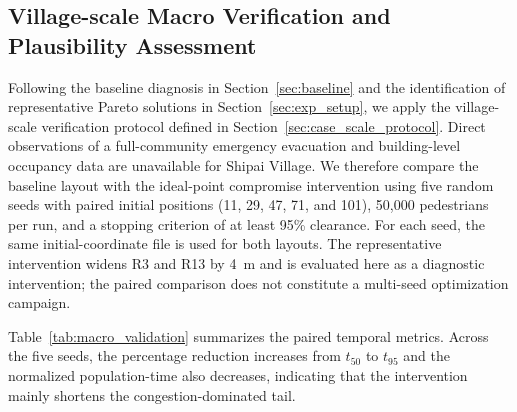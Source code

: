 \documentclass[preprint,12pt]{elsarticle}
\newcommand{\revfloat}{\color{blue}\captionsetup{font={color=blue},labelfont={color=blue}}}
\begin{document}
{\color{blue}
\subsection{Village-scale Macro Verification and Plausibility Assessment}
\label{sec:macro_verification}

Following the baseline diagnosis in Section~\ref{sec:baseline} and the identification of representative Pareto solutions
in Section~\ref{sec:exp_setup}, we apply the village-scale verification protocol defined in
Section~\ref{sec:case_scale_protocol}. Direct observations of a full-community emergency evacuation and building-level
occupancy data are unavailable for Shipai Village. We therefore compare the baseline layout with the ideal-point
compromise intervention using five random seeds with paired initial positions (11, 29, 47, 71, and 101), 50,000 pedestrians per run,
and a stopping criterion of at least 95\% clearance. For each seed, the same initial-coordinate file is used for both
layouts. The representative intervention widens R3 and R13 by 4~m and is evaluated here as a diagnostic intervention;
the paired comparison does not constitute a multi-seed optimization campaign.

Table~\ref{tab:macro_validation} summarizes the paired temporal metrics. Across the five seeds, the percentage reduction increases
from $t_{50}$ to $t_{95}$ and the normalized population-time also decreases, indicating that the intervention mainly
shortens the congestion-dominated tail.

\begin{table}[htbp]
\centering
\revfloat
\caption{Paired village-scale macro-verification results across five shared initial-position seeds.}
\label{tab:macro_validation}
\end{table}





}
\end{document}
